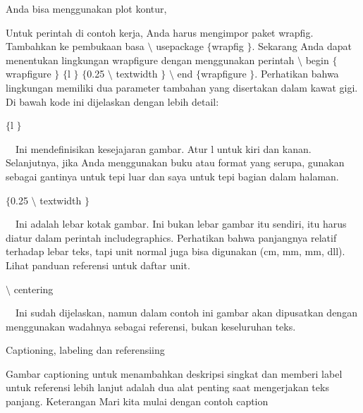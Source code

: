 \noindent 
Anda bisa menggunakan plot kontur, \par
\vspace{22pt}
\noindent 
Untuk perintah di contoh kerja, Anda harus mengimpor paket wrapfig. Tambahkan ke pembukaan basa  $  \setminus $ usepackage  $  \{  $wrapfig $  \}  $. Sekarang Anda dapat menentukan lingkungan wrapfigure dengan menggunakan perintah  $  \setminus $ begin  $  \{  $wrapfigure $  \}  $  $  \{  $l $  \}  $  $  \{  $0.25  $  \setminus $ textwidth $  \}  $  $  \setminus $ end  $  \{  $wrapfigure $  \}  $. Perhatikan bahwa lingkungan memiliki dua parameter tambahan yang disertakan dalam kawat gigi. Di bawah kode ini dijelaskan dengan lebih detail: \par
\vspace{12pt}
\noindent 
 $  \{  $l $  \}  $ \par
\noindent 
 $  $ $  $ $  $ $  $Ini mendefinisikan kesejajaran gambar. Atur l untuk kiri dan kanan. Selanjutnya, jika Anda menggunakan buku atau format yang serupa, gunakan sebagai gantinya untuk tepi luar dan saya untuk tepi bagian dalam halaman. \par
\vspace{12pt}
\noindent 
 $  \{  $0.25  $  \setminus $ textwidth $  \}  $ \par
\noindent 
 $  $ $  $ $  $ $  $Ini adalah lebar kotak gambar. Ini bukan lebar gambar itu sendiri, itu harus diatur dalam perintah includegraphics. Perhatikan bahwa panjangnya relatif terhadap lebar teks, tapi unit normal juga bisa digunakan (cm, mm, mm, dll). Lihat panduan referensi untuk daftar unit. \par
\vspace{12pt}
\noindent 
 $  \setminus $ centering \par
\noindent 
 $  $ $  $ $  $ $  $Ini sudah dijelaskan, namun dalam contoh ini gambar akan dipusatkan dengan menggunakan wadahnya sebagai referensi, bukan keseluruhan teks. \par
\vspace{12pt}
\vspace{12pt}
\vspace{16pt}
\noindent 
Captioning, labeling dan referensiing \par
\vspace{12pt}
\noindent 
Gambar captioning untuk menambahkan deskripsi singkat dan memberi label untuk referensi lebih lanjut adalah dua alat penting saat mengerjakan teks panjang. Keterangan Mari kita mulai dengan contoh caption \par
\vspace{36pt}
